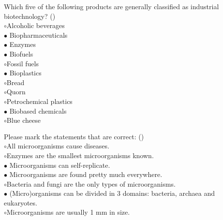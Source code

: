 \documentclass[]{beamer}
\begin{document}
\begin{CJK}{UTF8}{gbsn}
\begin{frame}[shrink] {} 
\addtocounter{questions}{1}
\color{blue}
  Which five of the following products are generally classified as industrial biotechnology?
 ({})\\
\color{black}
\setlength{\parindent}{-0.4cm}
{\color{red}$\circ$}Alcoholic beverages  \\
{\color{red}$\bullet$} Biopharmaceuticals  \\
{\color{red}$\bullet$} Enzymes   \\
{\color{red}$\bullet$} Biofuels  \\
{\color{red}$\circ$}Fossil fuels  \\
{\color{red}$\bullet$} Bioplastics  \\
{\color{red}$\circ$}Bread  \\
{\color{red}$\circ$}Quorn  \\
{\color{red}$\circ$}Petrochemical plastics  \\
{\color{red}$\bullet$} Biobased chemicals  \\
{\color{red}$\circ$}Blue cheese  \\
\end{frame}


\begin{frame}[shrink] {} 
\addtocounter{questions}{1}
\color{blue}
  Please mark the statements that are correct: 
 ({})\\
\color{black}
\setlength{\parindent}{-0.4cm}
{\color{red}$\circ$}All microorganisms cause diseases.  \\
{\color{red}$\circ$}Enzymes are the smallest microorganisms known.   \\
{\color{red}$\bullet$} Microorganisms can self-replicate.  \\
{\color{red}$\bullet$} Microorganisms are found pretty much everywhere.  \\
{\color{red}$\circ$}Bacteria and fungi are the only types of microorganisms.  \\
{\color{red}$\bullet$} (Micro)organisms can be divided in 3 domains: bacteria, archaea and eukaryotes.  \\
{\color{red}$\circ$}Microorganisms are usually 1 mm in size.  \\
\end{frame}



\end{CJK}
\end{document}
